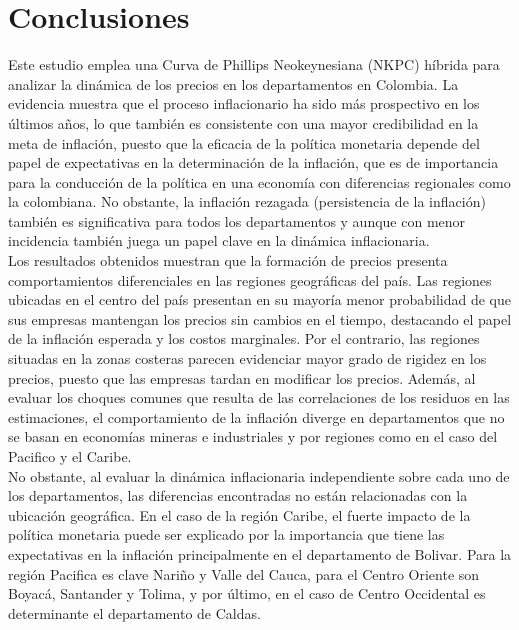 \chapter*{Conclusiones} \label{conclusiones}
Este estudio emplea una Curva de Phillips Neokeynesiana (NKPC) híbrida para analizar la dinámica de los precios en los departamentos en Colombia. La evidencia muestra que el proceso inflacionario ha sido más prospectivo en los últimos años, lo que también es consistente con una mayor credibilidad en la meta de inflación, puesto que la eficacia de la política monetaria depende del papel de expectativas en la determinación de la inflación, que es de importancia para la conducción de la política en una economía con diferencias regionales como la colombiana. No obstante, la inflación rezagada (persistencia de la inflación)  también es significativa para todos los departamentos y aunque con menor incidencia   también juega un papel clave en la dinámica inflacionaria. \\

Los resultados obtenidos muestran que la formación de precios presenta comportamientos diferenciales en las regiones geográficas del país. Las regiones ubicadas en el centro del país  presentan en su mayoría menor probabilidad de que sus empresas mantengan los precios sin cambios en el tiempo, destacando el papel de la inflación esperada y los costos marginales. Por el contrario, las regiones situadas en la zonas costeras parecen evidenciar mayor grado de rigidez en los precios, puesto que las empresas tardan en modificar los precios. Además, al evaluar los choques comunes que resulta de las correlaciones de los residuos en las estimaciones, el comportamiento de la inflación diverge en departamentos que no se basan en economías mineras e industriales y por regiones como en el caso del Pacifico y el Caribe. \\

No obstante, al evaluar la dinámica inflacionaria independiente sobre cada uno de los departamentos, las diferencias encontradas no están relacionadas con la ubicación geográfica. En el caso de la región Caribe, el fuerte impacto de la política monetaria puede ser explicado por la importancia que tiene las expectativas en la inflación principalmente en el departamento de Bolivar. Para la región Pacifica es clave Nariño y Valle del Cauca, para el Centro Oriente son Boyacá, Santander y Tolima, y por último, en el caso de Centro Occidental es determinante el departamento de Caldas.\\

